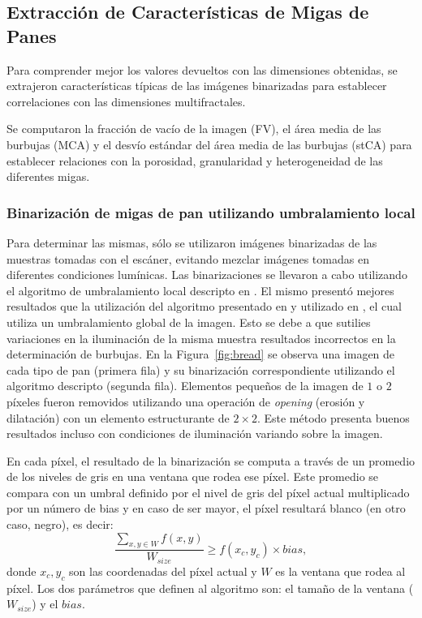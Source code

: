 \subsection{Extracción de Características de Migas de Panes}
Para comprender mejor los valores devueltos con las dimensiones obtenidas, se extrajeron características típicas de las imágenes binarizadas para establecer correlaciones con las dimensiones multifractales.

Se computaron la fracción de vacío de la imagen (FV), el área media de las burbujas (MCA) y el desvío estándar del área media de las burbujas (stCA) para establecer relaciones con la porosidad, granularidad y heterogeneidad de las diferentes migas.

\subsubsection{Binarización de migas de pan utilizando umbralamiento local}
Para determinar las mismas, sólo se utilizaron imágenes binarizadas de las muestras tomadas con el escáner, evitando mezclar imágenes tomadas en diferentes condiciones lumínicas. Las binarizaciones se llevaron a cabo utilizando el algoritmo de umbralamiento local descripto en \cite{White83}. El mismo presentó mejores resultados que la utilización del algoritmo presentado en \cite{Huang95} y utilizado en \cite{Gonzales2008}, el cual utiliza un umbralamiento global de la imagen. Esto se debe a que sutilies variaciones en la iluminación de la misma muestra resultados incorrectos en la determinación de burbujas. En la Figura~\ref{fig:bread} se observa una imagen de cada tipo de pan (primera fila) y su binarización correspondiente utilizando el algoritmo descripto (segunda fila). Elementos pequeños de la imagen de $1$ o $2$ píxeles fueron removidos utilizando una operación de {\em opening} (erosión y dilatación) con un elemento estructurante de $2\times 2$. Este método presenta buenos resultados incluso con condiciones de iluminación variando sobre la imagen.

En cada píxel, el resultado de la binarización se computa a través de un promedio de los niveles de gris en una ventana que rodea ese píxel. Este promedio se compara con un umbral definido por el nivel de gris del píxel actual multiplicado por un número de bias y en caso de ser mayor, el píxel resultará blanco (en otro caso, negro), es decir:
\begin{equation}
\frac{\sum_{x,y \in W} f(x,y) }{W_{size}} \geq f(x_{c},y_{c}) \times bias,
\label{eqn:white}
\end{equation}
donde $x_{c},y_{c}$ son las coordenadas del píxel actual y  $W$ es la ventana que rodea al píxel. Los dos parámetros que definen al algoritmo son: el tamaño de la ventana ($W_{size}$) y el $bias$. 

